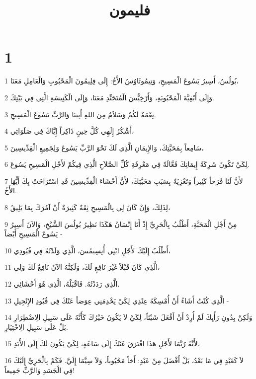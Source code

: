 

\title{فليمون}


\chapter{1}

\par 1 بُولُسُ، أَسِيرُ يَسُوعَ الْمَسِيحِ، وَتِيمُوثَاوُسُ الأَخُ: إِلَى فِلِيمُونَ الْمَحْبُوبِ وَالْعَامِلِ مَعَنَا،
\par 2 وَإِلَى أَبْفِيَّةَ الْمَحْبُوبَةِ، وَأَرْخِبُّسَ الْمُتَجَنِّدِ مَعَنَا، وَإِلَى الْكَنِيسَةِ الَّتِي فِي بَيْتِكَ.
\par 3 نِعْمَةٌ لَكُمْ وَسَلاَمٌ مِنَ اللهِ أَبِينَا وَالرَّبِّ يَسُوعَ الْمَسِيحِ.
\par 4 أَشْكُرُ إِلَهِي كُلَّ حِينٍ ذَاكِراً إِيَّاكَ فِي صَلَوَاتِي،
\par 5 سَامِعاً بِمَحَبَّتِكَ، وَالإِيمَانِ الَّذِي لَكَ نَحْوَ الرَّبِّ يَسُوعَ وَلِجَمِيعِ الْقِدِّيسِينَ،
\par 6 لِكَيْ تَكُونَ شَرِكَةُ إِيمَانِكَ فَعَّالَةً فِي مَعْرِفَةِ كُلِّ الصَّلاَحِ الَّذِي فِيكُمْ لأَجْلِ الْمَسِيحِ يَسُوعَ.
\par 7 لأَنَّ لَنَا فَرَحاً كَثِيراً وَتَعْزِيَةً بِسَبَبِ مَحَبَّتِكَ، لأَنَّ أَحْشَاءَ الْقِدِّيسِينَ قَدِ اسْتَرَاحَتْ بِكَ أَيُّهَا الأَخُ.
\par 8 لِذَلِكَ، وَإِنْ كَانَ لِي بِالْمَسِيحِ ثِقَةٌ كَثِيرَةٌ أَنْ آمُرَكَ بِمَا يَلِيقُ،
\par 9 مِنْ أَجْلِ الْمَحَبَّةِ، أَطْلُبُ بِالْحَرِيِّ إِذْ أَنَا إِنْسَانٌ هَكَذَا نَظِيرُ بُولُسَ الشَّيْخِ، وَالآنَ أَسِيرُ يَسُوعَ الْمَسِيحِ أَيْضاً -
\par 10 أَطْلُبُ إِلَيْكَ لأَجْلِ ابْنِي أُنِسِيمُسَ، الَّذِي وَلَدْتُهُ فِي قُيُودِي،
\par 11 الَّذِي كَانَ قَبْلاً غَيْرَ نَافِعٍ لَكَ، وَلَكِنَّهُ الآنَ نَافِعٌ لَكَ وَلِي،
\par 12 الَّذِي رَدَدْتُهُ. فَاقْبَلْهُ، الَّذِي هُوَ أَحْشَائِي.
\par 13 الَّذِي كُنْتُ أَشَاءُ أَنْ أُمْسِكَهُ عِنْدِي لِكَيْ يَخْدِمَنِي عِوَضاً عَنْكَ فِي قُيُودِ الإِنْجِيلِ -
\par 14 وَلَكِنْ بِدُونِ رَأْيِكَ لَمْ أُرِدْ أَنْ أَفْعَلَ شَيْئاً، لِكَيْ لاَ يَكُونَ خَيْرُكَ كَأَنَّهُ عَلَى سَبِيلِ الِاضْطِرَارِ بَلْ عَلَى سَبِيلِ الِاخْتِيَارِ.
\par 15 لأَنَّهُ رُبَّمَا لأَجْلِ هَذَا افْتَرَقَ عَنْكَ إِلَى سَاعَةٍ، لِكَيْ يَكُونَ لَكَ إِلَى الأَبَدِ،
\par 16 لاَ كَعَبْدٍ فِي مَا بَعْدُ، بَلْ أَفْضَلَ مِنْ عَبْدٍ: أَخاً مَحْبُوباً، وَلاَ سِيَّمَا إِلَيَّ. فَكَمْ بِالْحَرِيِّ إِلَيْكَ فِي الْجَسَدِ وَالرَّبِّ جَمِيعاً!
